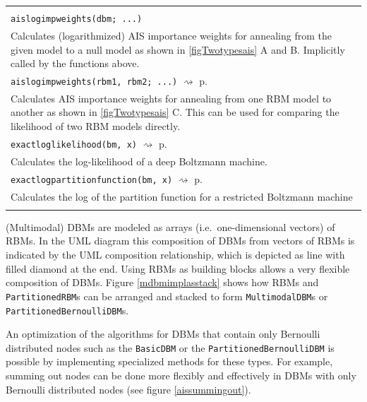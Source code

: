 \documentclass[12pt]{article}
\newcommand{\inlinecode}[1]{\texttt{#1}}
\newcommand{\rightpageref}[1]{\hfill $\rightsquigarrow$ p.\ \pageref{#1}}
\begin{document}
\begin{table}[h]
\begin{tabularx}{\textwidth}{X}
    \makecell[tl]{ 
    \inlinecode{aislogimpweights(rbm; ...)} \\
   \inlinecode{aislogimpweights(dbm; ...)}
   } \rightpageref{bms_aislogimpweights} \\
   Calculates (logarithmized) AIS importance weights for annealing from the given model to a null model as shown in \ref{figTwotypesais} A and B. Implicitly called by the functions above. \\
     \inlinecode{aislogimpweights(rbm1, rbm2; ...)}  \rightpageref{bms_aislogimpweights} \\
    Calculates AIS importance weights for annealing from one RBM model to another as shown in \ref{figTwotypesais} C.
    This can be used for comparing the likelihood of two RBM models directly.\\
       \inlinecode{exactloglikelihood(bm, x)} \rightpageref{bms_exactloglikelihood} \\
   Calculates the log-likelihood of a deep Boltzmann machine. \\
   \inlinecode{exactlogpartitionfunction(bm, x)} \rightpageref{bms_exactlogpartitionfunction} \\
   Calculates the log of the partition function for a restricted Boltzmann machine \\
 \Xhline{1pt}
\end{tabularx}
\end{table}


(Multimodal) DBMs are modeled as arrays (i.e.\ one-dimensional vectors) of RBMs.
In the UML diagram this composition of DBMs from vectors of RBMs is indicated by the UML composition relationship, which is depicted as line with filled diamond at the end.
Using RBMs as building blocks allows a very flexible composition of DBMs.
Figure \ref{mdbmimplasstack} shows how RBMs and \inlinecode{PartitionedRBM}s can be  arranged  and stacked to form \inlinecode{MultimodalDBM}s or \inlinecode{PartitionedBernoulliDBM}s.

An optimization of the algorithms for DBMs that contain only Bernoulli distributed nodes such as the \inlinecode{BasicDBM} or the \inlinecode{PartitionedBernoulliDBM} is possible by implementing specialized methods for these types.
For example, summing out nodes can be done more flexibly and effectively in DBMs with only Bernoulli distributed nodes (see figure \ref{aissummingout}).
\end{document}
